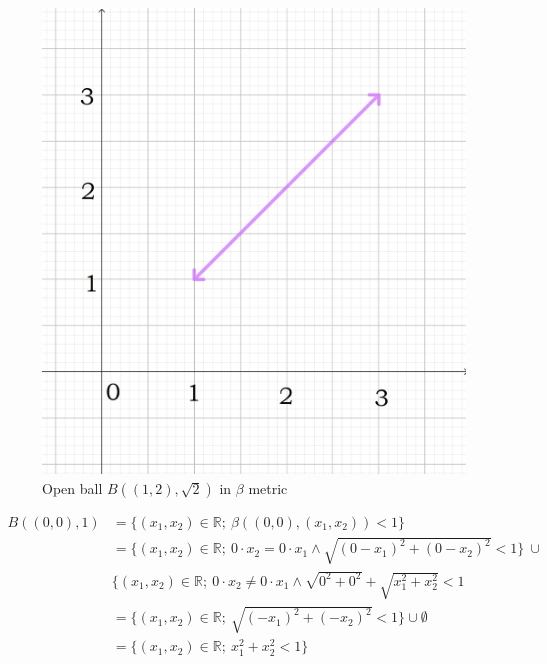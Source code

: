 \documentclass[12pt]{article}
\begin{document}
	\begin{figure}
		\centering
		\includegraphics[scale=0.20] {graph6}
		\caption{\label{fig:6} Open ball $B((1,2), \sqrt{2}) $ in $\beta$ metric }
	\end{figure}
	
	\begin{align*} B((0,0), 1) &= \{(x_{1}, x_{2}) \in \mathbb{R}; \ \beta((0,0),(x_{1}, x_{2}))<1\} \\
		&= \{(x_{1}, x_{2}) \in \mathbb{R}; \ 0 \cdot x_{2} = 0 \cdot x_{1} \land  \sqrt{(0-x_{1})^2 + (0-x_{2})^2} < 1 \} \ \cup \\ 
		&\{(x_{1}, x_{2}) \in \mathbb{R}; \ 0 \cdot x_{2} \neq 0 \cdot x_{1} \land  \sqrt{0^2 + 0^2} + \sqrt{x_{1}^2 + x_{2}^2} < 1 \\
		&= \{(x_{1}, x_{2}) \in \mathbb{R}; \  \sqrt{(-x_{1})^2 + (-x_{2})^2} < 1 \} \cup \emptyset \\
		&= \{(x_{1}, x_{2}) \in \mathbb{R}; \ x_{1}^2 + x_{2}^2 < 1\} 
	\end{align*}
\end{document}
